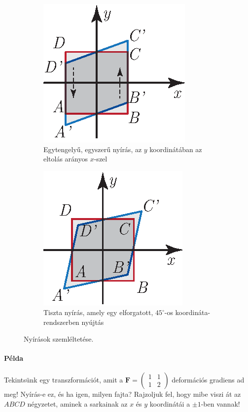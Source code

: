 \documentclass[12pt,a4paper]{scrartcl}
\let\mathbf\bm
\begin{document}
\begin{figure}[htb] 
\begin{subfigure}[b]{0.45\textwidth}
\centering
\includegraphics[scale=1]{figs/nyiras.eps}
\caption{Egytengelyű, egyszerű nyírás, az $y$ koordinátában az eltolás arányos $x$-szel}
\label{fig:nyiras}
\end{subfigure} \hfill
\begin{subfigure}[b]{0.45\textwidth}
\centering
\includegraphics[scale=1]{figs/tiszta_nyiras.eps}
\caption{Tiszta nyírás, amely egy elforgatott, $45^\circ$-os koordináta-rendszerben nyújtás}
\label{fig:tiszta_nyiras}
\end{subfigure}
\label{fig_nyujtasok}
\caption{Nyírások szemléltetése.}
\end{figure}
\FloatBarrier

\footnotesize
\paragraph{Példa} Tekintsünk egy transzformációt, amit a ${\mathbf{F}} = \left( {\begin{array}{*{20}{c}}
  1&1 \\ 
  1&2 
\end{array}} \right)$ deformációs gradiens ad meg! Nyírás-e ez, és ha igen, milyen fajta? Rajzoljuk fel, hogy mibe viszi át az $ABCD$ négyzetet, aminek a sarkainak az $x$ és $y$ koordinátái a $\pm 1$-ben vannak!
\end{document}
